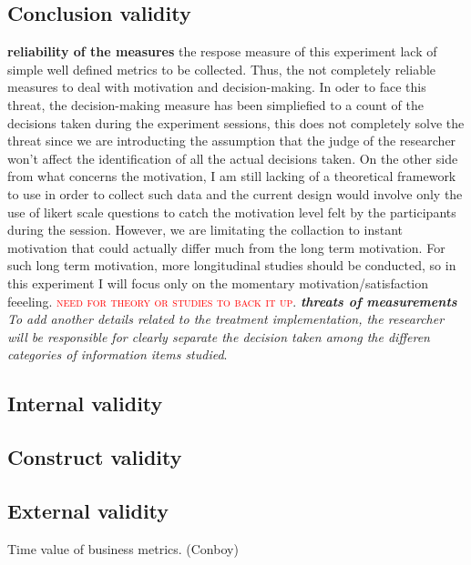 \documentclass[runningheads]{llncs}
\begin{document}
\subsection{Conclusion validity}

\textbf{reliability of the measures} the respose measure of this experiment lack of simple well defined metrics to be collected. Thus, the not completely reliable measures to deal with motivation and decision-making. In oder to face this threat, the decision-making measure has been simpliefied to a count of the decisions taken during the experiment sessions, this does not completely solve the threat since we are introducting the assumption that the judge of the researcher won't affect the identification of all the actual decisions taken. On the other side from what concerns the motivation, I am still lacking of a theoretical framework to use in order to collect such data and the current design would involve only the use of likert scale questions to catch the motivation level felt by the participants during the session. However, we are limitating the collaction to instant motivation that could actually differ much from the long term motivation. For such long term motivation, more longitudinal studies should be conducted, so in this experiment I will focus only on the momentary motivation/satisfaction feeeling. \textsc{\textcolor{red}{need for theory or studies to back it up}}. \textit{\textbf{threats of measurements} To add another details related to the treatment implementation, the researcher will be responsible for clearly separate the decision taken among the differen categories of information items studied}.

\subsection{Internal validity}



\subsection{Construct validity}

\subsection{External validity}


Time value of business metrics. (Conboy)


%
%
%
% 
% 
%
\end{document}
